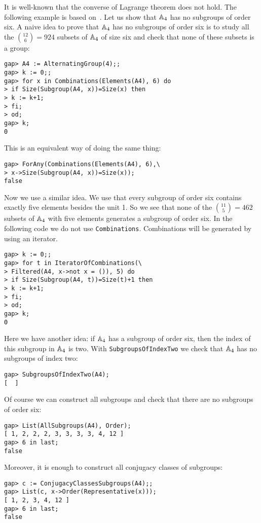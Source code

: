\begin{example}
It is well-known that the converse of Lagrange theorem does not hold.  The
following example is based on~\cite{MR1573427}.  
Let us show that $\mathbb{A}_4$ has no subgroups of order six. 
A naive idea to prove that $\mathbb{A}_4$ has no subgroups of order six is to study
all the $\binom{12}{6}=924$ subsets of $\mathbb{A}_4$ of size six and check that none
of these subsets is a group: 
\begin{lstlisting}
gap> A4 := AlternatingGroup(4);;
gap> k := 0;;
gap> for x in Combinations(Elements(A4), 6) do
> if Size(Subgroup(A4, x))=Size(x) then
> k := k+1;
> fi;
> od;
gap> k;
0
\end{lstlisting}
This is an equivalent way of doing the same thing:
\begin{lstlisting}
gap> ForAny(Combinations(Elements(A4), 6),\
> x->Size(Subgroup(A4, x))=Size(x));
false
\end{lstlisting}

Now we use a similar idea. We use that every subgroup of order six contains
exactly five elements besides the unit 1.  So we see that none of the $\binom{11}{5}=462$
subsets of $\mathbb{A}_4$ with five elements generates a subgroup of order six.  In
the following code we do not use \lstinline{Combinations}. Combinations will be
generated by using an iterator.
\begin{lstlisting}
gap> k := 0;;
gap> for t in IteratorOfCombinations(\
> Filtered(A4, x->not x = ()), 5) do
> if Size(Subgroup(A4, t))=Size(t)+1 then
> k := k+1;
> fi;
> od;
gap> k;
0
\end{lstlisting}

Here we have another idea: if $\mathbb{A}_4$ has a subgroup of order six, then the
index of this subgroup in $\mathbb{A}_4$ is two.  With
\lstinline{SubgroupsOfIndexTwo} we check that $\mathbb{A}_4$ has no subgroups of
index two:
\begin{lstlisting}
gap> SubgroupsOfIndexTwo(A4);
[  ]
\end{lstlisting}

Of course we can construct all subgroups and check that there are no subgroups
of order six: 
\begin{lstlisting}
gap> List(AllSubgroups(A4), Order);
[ 1, 2, 2, 2, 3, 3, 3, 3, 4, 12 ]
gap> 6 in last;
false
\end{lstlisting}
Moreover, it is enough to construct all conjugacy classes of subgroups:
\begin{lstlisting}
gap> c := ConjugacyClassesSubgroups(A4);;
gap> List(c, x->Order(Representative(x)));
[ 1, 2, 3, 4, 12 ]
gap> 6 in last;
false
\end{lstlisting}


\end{example}
